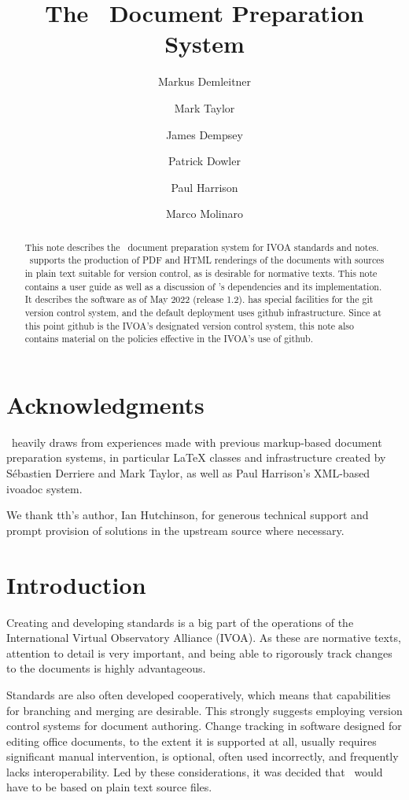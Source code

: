 \documentclass[11pt,a4paper]{ivoa}
\title{The \ivoatex\ Document Preparation System}
\author[http://www.ivoa.net/cgi-bin/twiki/bin/view/IVOA/MarkusDemleitner]{Markus Demleitner}
\author[http://www.ivoa.net/cgi-bin/twiki/bin/view/IVOA/MarkTaylor]{Mark Taylor}
\author[http://www.ivoa.net/cgi-bin/twiki/bin/view/IVOA/JamesDempsey]{James Dempsey}
\author[http://www.ivoa.net/cgi-bin/twiki/bin/view/IVOA/PatrickDowler]{Patrick Dowler}
\author[http://www.ivoa.net/cgi-bin/twiki/bin/view/IVOA/PaulHarrison]{Paul Harrison}
\author[http://www.ivoa.net/cgi-bin/twiki/bin/view/IVOA/MarcoMolinaro]{Marco Molinaro}
\begin{document}
\begin{abstract}
This note describes the \ivoatex\ document preparation system for IVOA
standards and notes.  \ivoatex\ supports the production of
PDF and HTML renderings of the documents with sources in
plain text suitable for version control, as is desirable for normative
texts.  This note contains a user guide as well as a discussion of
\ivoatex's dependencies and its implementation.  It describes the
software as of May 2022 (release 1.2).
\ivoatex{} has special facilities for the git version control system,
and the default deployment uses github infrastructure.  Since at this
point github is the IVOA's designated version control system, this note
also contains material on the policies effective in the IVOA's use of
github.

\end{abstract}


\section*{Acknowledgments}

\ivoatex\ heavily draws from experiences made with previous markup-based
document preparation systems, in particular LaTeX classes and
infrastructure created by S\'ebastien Derriere and Mark Taylor, as well
as Paul Harrison's XML-based ivoadoc system.

We thank tth's author, Ian Hutchinson, for generous technical support
and prompt provision of solutions in the upstream source where necessary.

\section{Introduction}

Creating and developing standards is a  big part of the operations of
the International Virtual Observatory Alliance (IVOA).
As these are normative texts, attention to detail is very important, and
being able to rigorously track changes to the documents is highly
advantageous.

Standards are also often developed cooperatively, which means that
capabilities for branching and merging are desirable.  This strongly
suggests employing version control systems for document authoring.
Change tracking in software designed for editing office documents, to
the extent it is supported at all, usually requires significant
manual intervention, is optional, often used incorrectly, and frequently
lacks interoperability.  Led by these considerations, it was decided that
\ivoatex\ would have to be based on plain text source files.
\end{document}
